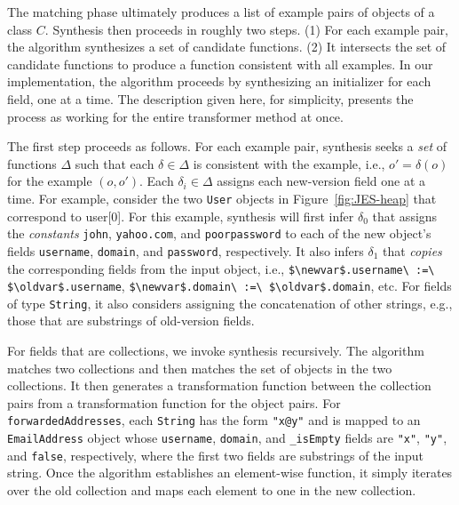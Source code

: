 \documentclass[natbib,10pt]{sigplanconf}
\newcommand{\code}[1]{\lstinline|#1|\xspace}
\newcommand{\mwh}[1]{\textcolor{blue}{Mike: #1}}
\begin{document}
The matching phase ultimately produces a list of example pairs of
objects of a class $C$.  Synthesis then proceeds in roughly two steps.  (1) For
each example pair, the algorithm synthesizes a set of candidate functions.  (2) It
intersects the set of candidate functions to
produce a function consistent with all examples. In our implementation, the algorithm proceeds by synthesizing an initializer for each
field, one at a time.  The description given here, for simplicity,
presents the process as working for the entire transformer method at
once. %

The first step proceeds as follows.  For each example  pair,
synthesis seeks a \emph{set} of functions $\Delta$ such that each
$\delta \in \Delta$ is consistent with the example, i.e., $o' =
\delta(o)$ for the example $(o,o')$.
Each $\delta_i \in \Delta$ assigns each new-version field one at a
time.   For example, consider the two \code{User} objects in
Figure~\ref{fig:JES-heap} that correspond to \textsf{user[0]}.  For
this example, synthesis will first infer $\delta_0$ that assigns the
\emph{constants} \code{john}, \code{yahoo.com}, and \code{poorpassword} to
each of the new object's fields \code{username}, \code{domain}, and
\code{password}, respectively. It also infers $\delta_1$ that \emph{copies} the
corresponding fields from the input object, i.e.,
\code{$\newvar$.username\ :=\ $\oldvar$.username},
\code{$\newvar$.domain\ :=\ $\oldvar$.domain}, etc.  For fields of type
\code{String}, it also considers assigning the concatenation of other strings,
e.g., those that are substrings of old-version fields.

For fields that are collections, we invoke synthesis recursively.  The
algorithm matches two
collections and then matches the set of objects in the two
collections. It then generates a transformation function between the
collection pairs from a transformation function for the object pairs.  For
\code{forwardedAddresses}, each \code{String} has the
form \code{"x@y"} and is mapped to an \code{EmailAddress} object
whose \code{username}, \code{domain}, and \code{_isEmpty} fields are
\code{"x"}, \code{"y"}, and \code{false}, respectively, where the
first two fields are substrings of the input string.  Once the
algorithm establishes an
element-wise function, it simply iterates over the old collection and
maps each element to one in the new collection.  
\end{document}
